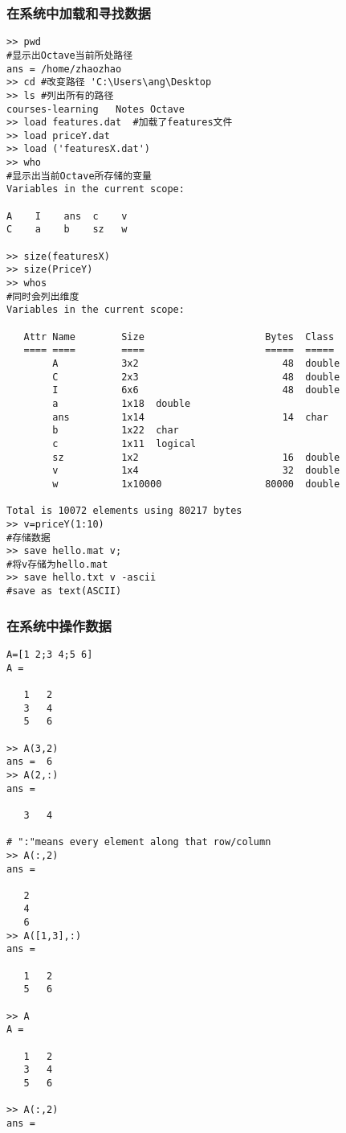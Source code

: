 \documentclass{article}
\begin{document}
\begin{CJK}{UTF8}{gbsn}
\subsubsection{在系统中加载和寻找数据}
\begin{verbatim}
>> pwd
#显示出Octave当前所处路径
ans = /home/zhaozhao
>> cd #改变路径 'C:\Users\ang\Desktop
>> ls #列出所有的路径
courses-learning   Notes Octave
>> load features.dat  #加载了features文件
>> load priceY.dat
>> load ('featuresX.dat')
>> who
#显示出当前Octave所存储的变量
Variables in the current scope:

A    I    ans  c    v
C    a    b    sz   w

>> size(featuresX)
>> size(PriceY)
>> whos
#同时会列出维度
Variables in the current scope:

   Attr Name        Size                     Bytes  Class
   ==== ====        ====                     =====  =====
        A           3x2                         48  double
        C           2x3                         48  double
        I           6x6                         48  double
        a           1x18  double
        ans         1x14                        14  char
        b           1x22  char
        c           1x11  logical
        sz          1x2                         16  double
        v           1x4                         32  double
        w           1x10000                  80000  double

Total is 10072 elements using 80217 bytes
>> v=priceY(1:10)
#存储数据
>> save hello.mat v;
#将v存储为hello.mat
>> save hello.txt v -ascii 
#save as text(ASCII)
\end{verbatim}
\subsubsection{在系统中操作数据}
\begin{verbatim}
A=[1 2;3 4;5 6]
A =

   1   2
   3   4
   5   6

>> A(3,2)
ans =  6
>> A(2,:)
ans =

   3   4

# ":"means every element along that row/column
>> A(:,2)
ans =

   2
   4
   6
>> A([1,3],:)
ans =

   1   2
   5   6

>> A
A =

   1   2
   3   4
   5   6

>> A(:,2)
ans =


\end{verbatim}
\end{CJK}
\end{document}
